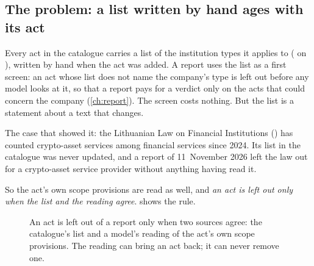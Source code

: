\subsection{The problem: a list written by hand ages with its act}

Every act in the catalogue carries a list of the institution types it applies to
( on ), written by hand when the act was added. A
report uses the list as a first screen: an act whose list does not name the company's type is
left out before any model looks at it, so that a report pays for a verdict only on the acts
that could concern the company (\cref{ch:report}). The screen costs nothing. But the list is
a statement about a text that changes.

The case that showed it: the Lithuanian Law on Financial Institutions () has counted crypto-asset services among financial services since 2024. Its list
in the catalogue was never updated, and a report of 11~November 2026 left the law out for a
crypto-asset service provider without anything having read it.

So the act's own scope provisions are read as well, and \emph{an act is left out only when
the list and the reading agree}.  shows the rule.

\begin{figure}[H]
\centering
{}
\actorlegend
\caption{An act is left out of a report only when two sources agree: the catalogue's list and
a model's reading of the act's own scope provisions. The reading can bring an act back; it can
never remove one.}\label{fig:obligations:scope}
\end{figure}

